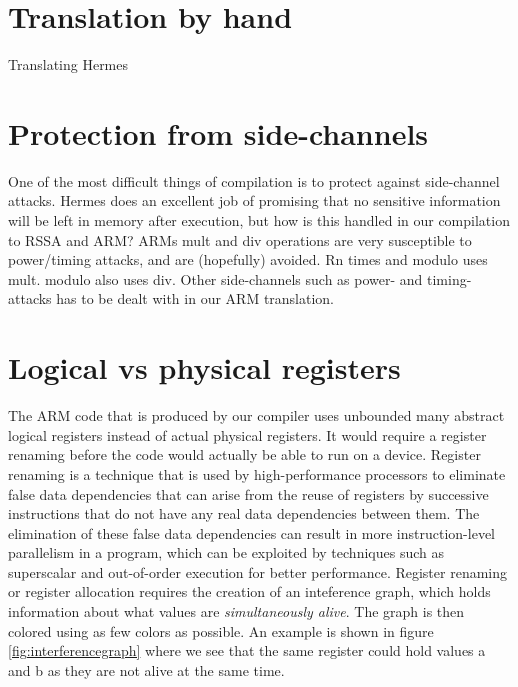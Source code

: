 \section{Translation by hand}
Translating Hermes


\section{Protection from side-channels}
One of the most difficult things of compilation is to protect against side-channel attacks. Hermes does an excellent job of promising that no sensitive information will be left in memory after execution, but how is this handled in our compilation to RSSA and ARM? %
ARMs mult and div operations are very susceptible to power/timing attacks, and are (hopefully) avoided. Rn times and modulo uses mult. modulo also uses div. 
Other side-channels such as power- and timing-attacks has to be dealt with in our ARM translation. %


\section{Logical vs physical registers}
The ARM code that is produced by our compiler uses unbounded many abstract logical registers instead of actual physical registers.
It would require a register renaming before the code would actually be able to run on a device.
Register renaming is a technique that is used by high-performance processors to eliminate false data dependencies that can arise from the reuse of registers by successive instructions that do not have any real data dependencies between them.
The elimination of these false data dependencies can result in more instruction-level parallelism in a program, which can be exploited by techniques such as superscalar and out-of-order execution for better performance.
Register renaming or register allocation requires the creation of an inteference graph, which holds information about what values are \emph{simultaneously alive}. The graph is then colored using as few colors as possible. An example is shown in figure \ref{fig:interferencegraph} where we see that the same register could hold values a and b as they are not alive at the same time.

